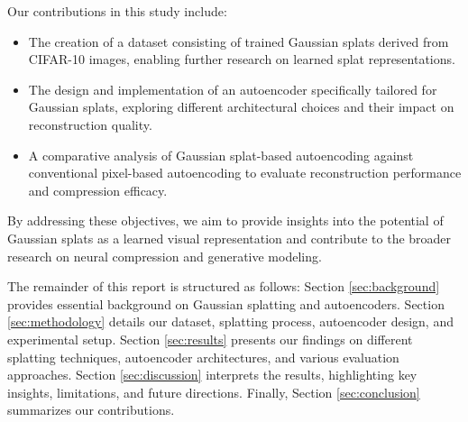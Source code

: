 Our contributions in this study include:
\begin{itemize}
    \item The creation of a dataset consisting of trained Gaussian splats derived from CIFAR-10 images, enabling further research on learned splat representations.
    \item The design and implementation of an autoencoder specifically tailored for Gaussian splats, exploring different architectural choices and their impact on reconstruction quality.
    \item A comparative analysis of Gaussian splat-based autoencoding against conventional pixel-based autoencoding to evaluate reconstruction performance and compression efficacy.
\end{itemize}

By addressing these objectives, we aim to provide insights into the potential of Gaussian splats as a learned visual representation and contribute to the broader research on neural compression and generative modeling.

The remainder of this report is structured as follows: Section \ref{sec:background} provides essential background on Gaussian splatting and autoencoders. Section \ref{sec:methodology} details our dataset, splatting process, autoencoder design, and experimental setup. Section \ref{sec:results} presents our findings on different splatting techniques, autoencoder architectures, and various evaluation approaches. Section \ref{sec:discussion} interprets the results, highlighting key insights, limitations, and future directions. Finally, Section \ref{sec:conclusion} summarizes our contributions.  
